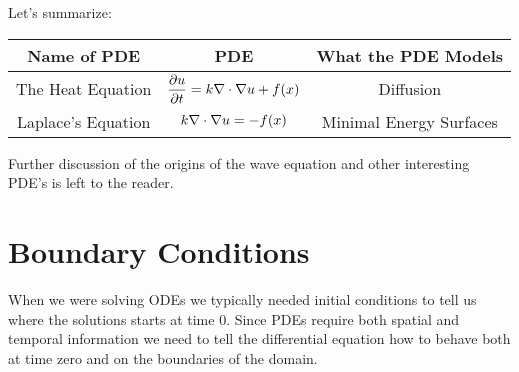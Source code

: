 Let's summarize:
\begin{center}
    \begin{tabular}{|c|c|c|}
        \hline
        Name of PDE & PDE & What the PDE Models \\ \hline \hline
        The Heat Equation & $\displaystyle \frac{\partial{u}}{\partial{t}} = k \nabla \cdot \nabla u + f(x)$ & Diffusion \\
        Laplace's Equation & $\displaystyle k \nabla \cdot \nabla u =-f(x)$ & Minimal Energy
        Surfaces \\
        \hline
    \end{tabular}
\end{center}

Further discussion of the origins of the wave equation and other interesting PDE's is left
to the reader.


\newpage\section{Boundary Conditions}
When we were solving ODEs we typically needed initial conditions to tell us where the
solutions starts at time 0.  Since PDEs require both spatial and temporal information we
need to tell the differential equation how to behave both at time zero and on the
boundaries of the domain.  


